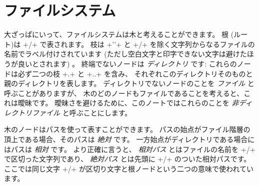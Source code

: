 \section{ファイルシステム}

大ざっぱにいって、ファイルシステムは木と考えることができます。
根 (ルート)は \ml+/+ で表されます。
枝は \ml+''+ と \ml+/+ を除く文字列からなるファイルの名前でラベル付けされています
(ただし空白文字と印字できない文字は避けたほうが良いとされます) 。
終端でないノードは \emph{ディレクトリ} です: これらのノードは必ず二つの枝 \ml+.+ と \ml+..+ を含み、
それぞれこのディレクトリそのものと親のディレクトリを表します。
ディレクトリでないノードのことを \emph{ファイル} と呼ぶことがありますが、
木のどのノードもファイルであることを考えると、これは曖昧です。
曖昧さを避けるために、このノートではこれらのことを \emph{非ディレクトリファイル} と呼ぶことにします。

木のノードはパスを使って表すことができます。
パスの始点がファイル階層の頂上である場合、そのパスは \emph{絶対} です。
一方始点がディレクトリである場合にはパスは \emph{相対} です。
より正確に言うと、 \emph{相対パス} とはファイルの名前を \ml+/+ で区切った文字列であり、
\emph{絶対パス} とは先頭に \ml+/+ のついた相対パスです。
ここでは同じ文字 \ml+/+ が区切り文字と根ノードという二つの意味で使われています。


